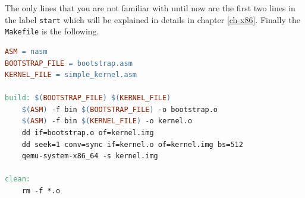 The only lines that you are not familiar with until now are the first
two lines in the label \lstinline!start! which will be explained in
details in chapter \ref{ch-x86}. Finally the \lstinline!Makefile! is the
following.

\begin{lstlisting}[language=make]
ASM = nasm
BOOTSTRAP_FILE = bootstrap.asm 
KERNEL_FILE = simple_kernel.asm

build: $(BOOTSTRAP_FILE) $(KERNEL_FILE)
    $(ASM) -f bin $(BOOTSTRAP_FILE) -o bootstrap.o
    $(ASM) -f bin $(KERNEL_FILE) -o kernel.o
    dd if=bootstrap.o of=kernel.img
    dd seek=1 conv=sync if=kernel.o of=kernel.img bs=512
    qemu-system-x86_64 -s kernel.img

clean:
    rm -f *.o
\end{lstlisting}


